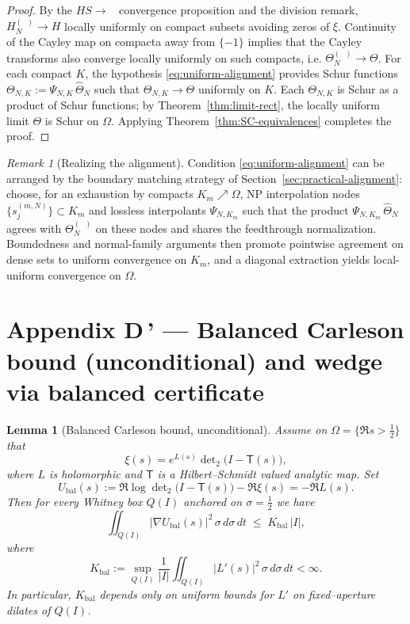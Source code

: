 \documentclass[11pt]{article}
\newtheorem{lemma}[theorem]{Lemma}
\theoremstyle{definition}
\theoremstyle{remark}
\newtheorem{remark}[theorem]{Remark}
\DeclareMathOperator{\dettwo}{det_2}
\begin{document}
\begin{proof}
By the \(HS\to\dettwo\) convergence proposition and the division remark, \(H_N^{(\dettwo)}\to H\) locally uniformly on compact subsets avoiding zeros of \(\xi\). Continuity of the Cayley map on compacta away from \(\{-1\}\) implies that the Cayley transforms also converge locally uniformly on such compacts, i.e. \(\Theta_N^{(\dettwo)}\to\Theta\). For each compact \(K\), the hypothesis \eqref{eq:uniform-alignment} provides Schur functions \(\Theta_{N,K}:=\Psi_{N,K}\,\widehat\Theta_N\) such that \(\Theta_{N,K}\to\Theta\) uniformly on \(K\). Each \(\Theta_{N,K}\) is Schur as a product of Schur functions; by Theorem~\ref{thm:limit-rect}, the locally uniform limit \(\Theta\) is Schur on \(\Omega\). Applying Theorem~\ref{thm:SC-equivalences} completes the proof.
\end{proof}
\begin{remark}[Realizing the alignment]
Condition \eqref{eq:uniform-alignment} can be arranged by the boundary matching strategy of Section~\ref{sec:practical-alignment}: choose, for an exhaustion by compacts \(K_m\nearrow\Omega\), NP interpolation nodes \(\{s_{j}^{(m,N)}\}\subset K_m\) and lossless interpolants \(\Psi_{N,K_m}\) such that the product \(\Psi_{N,K_m}\,\widehat\Theta_N\) agrees with \(\Theta_N^{(\dettwo)}\) on these nodes and shares the feedthrough normalization. Boundedness and normal-family arguments then promote pointwise agreement on dense sets to uniform convergence on \(K_m\), and a diagonal extraction yields local-uniform convergence on \(\Omega\).
\end{remark}

\section*{Appendix D\,' — Balanced Carleson bound (unconditional) and wedge via balanced certificate}

\begin{lemma}[Balanced Carleson bound, unconditional]\label{lem:balanced-carleson}
Assume on $\Omega=\{\Re s>\tfrac12\}$ that
\[
\xi(s) = e^{L(s)} \det\nolimits_2\!\bigl(I-\mathsf T(s)\bigr),
\]
where $L$ is holomorphic and $\mathsf T$ is a Hilbert--Schmidt valued analytic map. Set
\[
U_{\mathrm{bal}}(s) := \Re\log\det\nolimits_2\!\bigl(I-\mathsf T(s)\bigr)-\Re\xi(s) = -\Re L(s).
\]
Then for every Whitney box $Q(I)$ anchored on $\sigma=\tfrac12$ we have
\[
\iint_{Q(I)} |\nabla U_{\mathrm{bal}}(s)|^2 \,\sigma\, d\sigma\, dt \;\le\; K_{\mathrm{bal}}\, |I|,
\]
where
\[
K_{\mathrm{bal}} := \sup_{Q(I)} \frac{1}{|I|}\iint_{Q(I)} |L'(s)|^2 \,\sigma\, d\sigma\, dt < \infty.
\]
In particular, $K_{\mathrm{bal}}$ depends only on uniform bounds for $L'$ on fixed--aperture dilates of $Q(I)$.
\end{lemma}
\end{document}
